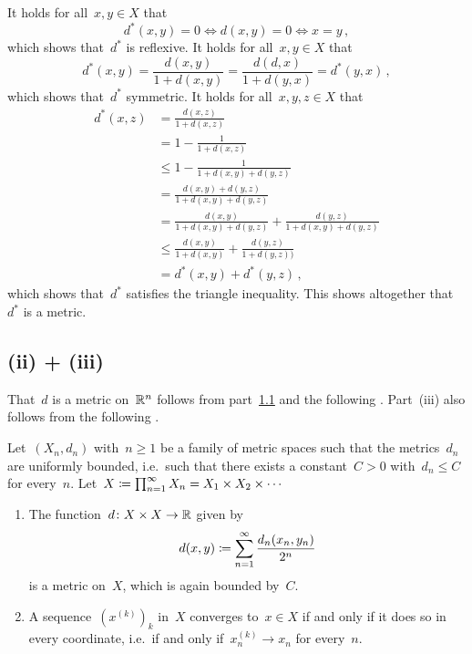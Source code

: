 \section{}





\subsection{}
\label{new metric}

It holds for all~$x, y \in X$ that
\[
        d^*(x,y) = 0
  \iff  d(x,y) = 0
  \iff  x = y \,,
\]
which shows that~$d^*$ is reflexive.
It holds for all~$x, y \in X$ that
\[
    d^*(x,y)
  = \frac{d(x,y)}{1 + d(x,y)}
  = \frac{d(d,x)}{1 + d(y,x)}
  = d^*(y,x) \,,
\]
which shows that~$d^*$ symmetric.
It holds for all~$x, y, z \in X$ that
\begin{align*}
          d^*(x,z)
  &=      \frac{d(x,z)}{1 + d(x,z)} \\
  &=      1 - \frac{1}{1 + d(x,z)}  \\
  &\leq   1 - \frac{1}{1 + d(x,y) + d(y,z)} \\
  &=      \frac{d(x,y) + d(y,z)}{1 + d(x,y) + d(y,z)} \\
  &=      \frac{d(x,y)}{1 + d(x,y) + d(y,z)} + \frac{d(y,z)}{1 + d(x,y) + d(y,z)} \\
  &\leq   \frac{d(x,y)}{1 + d(x,y)} + \frac{d(y,z)}{1 + d(y,z))}  \\
  &=      d^*(x,y) + d^*(y,z) \,,
\end{align*}
which shows that~$d^*$ satisfies the triangle inequality.
This shows altogether that~$d^*$ is a metric.





\subsection*{(ii) + (iii)}

That~$d$ is a metric on~$\mathbb{R}^n$ follows from part~\ref{new metric} and the following .
Part~(iii) also follows from the following .

\begin{lemma}
  \label{point set topology}
  Let~$(X_n, d_n)$ with~$n \geq 1$ be a family of metric spaces such that the metrics~$d_n$ are uniformly bounded, i.e.\ such that there exists a constant~$C > 0$ with~$d_n \leq C$ for every~$n$.
  Let~$X \coloneqq \prod_{n=1}^\infty X_n = X_1 \times X_2 \times \dotsb$
  \begin{enumerate}
    \item
      The function~$d \colon X \times X \to \mathbb{R}$ given by
      \[
                  d(x,y)
        \coloneqq  \sum_{n=1}^\infty \frac{d_n(x_n, y_n)}{2^n}
      \]
      is a {\welldef} metric on~$X$, which is again bounded by~$C$.
    \item
      A sequence~$( x^{(k)} )_k$ in~$X$ converges to~$x \in X$ if and only if it does so in every coordinate, i.e.\ if and only if~$x^{(k)}_n \to x_n$ for every~$n$.
  \end{enumerate}
\end{lemma}

